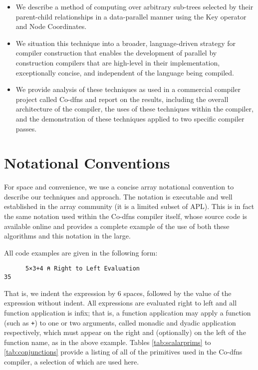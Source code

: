 \documentclass[numbers,preprint]{sigplanconf}
\begin{document}
\begin{itemize}[noitemsep]

\item We describe a method of computing over arbitrary sub-trees
selected by their parent-child relationships in a data-parallel manner
using the Key operator and Node Coordinates.

\item We situation this technique into a broader, language-driven 
strategy for compiler construction that enables the development of parallel 
by construction compilers that are high-level in their implementation, 
exceptionally concise, and independent of the language being compiled.

\item We provide analysis of these techniques as used in a commercial
compiler project called Co-dfns and report on the results,
including the overall architecture of the compiler, the uses of these 
techniques within the compiler, and the demonstration of these techniques 
applied to two specific compiler passes.

\end{itemize}

\section{Notational Conventions}

For space and convenience, we use a concise array notational convention to 
describe our techniques and approach. The notation is executable and well 
established in the array community (it is a limited subset of APL). This is 
in fact the same notation used within the Co-dfns compiler itself, whose 
source code is available online and provides a complete example of the use 
of both these algorithms and this notation in the large. 

All code examples are given in the following form:

\begin{verbatim}
      5×3+4 ⍝ Right to Left Evaluation
35
\end{verbatim}

\noindent
That is, we indent the expression by 6 spaces, followed by the value
of the expression without indent. All expressions are evaluated right to 
left and all function application is infix; that is, a function 
application may apply a function (such as \verb;+;) to one or two arguments, 
called monadic and dyadic application respectively,
which must appear on the right and (optionally) on the left of the function 
name, as in the above example. Tables \ref{tab:scalarprims} to 
\ref{tab:conjunctions}
provide a listing of all of the primitives used in the Co-dfns compiler, 
a selection of which are used here. 
\end{document}
